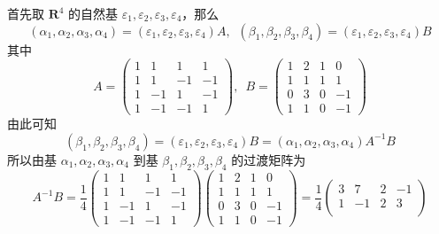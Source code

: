 \documentclass[12pt,fontset=fandol]{ctexart}
\begin{document}
\begin{solve}
首先取 $ \mathbf{R}^4 $ 的自然基 $\varepsilon_1, \varepsilon_2, \varepsilon_3, \varepsilon_4$，那么
            \[ (\alpha_1, \alpha_2, \alpha_3, \alpha_4) = (\varepsilon_1, \varepsilon_2, \varepsilon_3, \varepsilon_4) A,\enspace (\beta_1, \beta_2, \beta_3, \beta_4) = (\varepsilon_1, \varepsilon_2, \varepsilon_3, \varepsilon_4) B \]
            其中
            \[ A = \begin{pmatrix}
                    1 & 1  & 1  & 1  \\
                    1 & 1  & -1 & -1 \\
                    1 & -1 & 1  & -1 \\
                    1 & -1 & -1 & 1
                \end{pmatrix},\enspace B = \begin{pmatrix}
                    1 & 2 & 1 & 0  \\
                    1 & 1 & 1 & 1  \\
                    0 & 3 & 0 & -1 \\
                    1 & 1 & 0 & -1
                \end{pmatrix} \]
            由此可知
            \[ (\beta_1, \beta_2, \beta_3, \beta_4) = (\varepsilon_1, \varepsilon_2, \varepsilon_3, \varepsilon_4) B = (\alpha_1, \alpha_2, \alpha_3, \alpha_4) A^{-1} B \]
            所以由基 $ \alpha_1, \alpha_2, \alpha_3, \alpha_4 $ 到基 $ \beta_1, \beta_2, \beta_3, \beta_4 $ 的过渡矩阵为
            \[ A^{-1} B = \dfrac{1}{4} \begin{pmatrix}
                    1 & 1  & 1  & 1  \\
                    1 & 1  & -1 & -1 \\
                    1 & -1 & 1  & -1 \\
                    1 & -1 & -1 & 1
                \end{pmatrix} \begin{pmatrix}
                    1 & 2 & 1 & 0  \\
                    1 & 1 & 1 & 1  \\
                    0 & 3 & 0 & -1 \\
                    1 & 1 & 0 & -1
                \end{pmatrix} = \dfrac{1}{4} \begin{pmatrix}
                    3  & 7  & 2 & -1 \\
                    1  & -1 & 2 & 3  \\

\end{pmatrix}\]
\end{solve}
\end{document}
